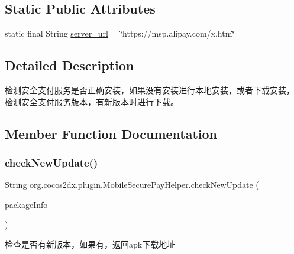 \subsection*{Static Public Attributes}
\begin{DoxyCompactItemize}
\item 
static final String \hyperlink{classorg_1_1cocos2dx_1_1plugin_1_1MobileSecurePayHelper_af06c96d6c405c8d71cc957488fa673ae}{server\+\_\+url} = \char`\"{}https\+://msp.\+alipay.\+com/x.\+htm\char`\"{}
\end{DoxyCompactItemize}


\subsection{Detailed Description}
检测安全支付服务是否正确安装，如果没有安装进行本地安装，或者下载安装， 检测安全支付服务版本，有新版本时进行下载。 

\subsection{Member Function Documentation}
\mbox{\label{classorg_1_1cocos2dx_1_1plugin_1_1MobileSecurePayHelper_a6f4d26833a00d643c2905cbd284df143}} 
\subsubsection{\texorpdfstring{check\+New\+Update()}{checkNewUpdate()}}
{\footnotesize\ttfamily String org.\+cocos2dx.\+plugin.\+Mobile\+Secure\+Pay\+Helper.\+check\+New\+Update (\begin{DoxyParamCaption}\item[{Package\+Info}]{package\+Info }\end{DoxyParamCaption})\hspace{0.3cm}{\ttfamily [inline]}}

检查是否有新版本，如果有，返回apk下载地址


